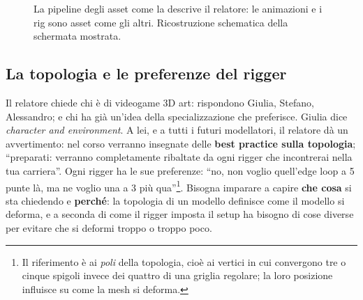 \begin{figure}[htbp]
\centering
{}
\caption{La pipeline degli asset come la descrive il relatore: le animazioni e
i rig sono asset come gli altri. Ricostruzione schematica della schermata
mostrata.}
\label{p4:fig:pipeline}
\end{figure}

\subsection{La topologia e le preferenze del rigger}

Il relatore chiede chi è di videogame 3D art: rispondono Giulia, Stefano,
Alessandro; e chi ha già un'idea della specializzazione che preferisce.
Giulia dice \emph{character and environment}. A lei, e a tutti i futuri
modellatori, il relatore dà un avvertimento: nel corso verranno insegnate
delle \textbf{best practice sulla topologia}; ``preparati: verranno
completamente ribaltate da ogni rigger che incontrerai nella tua carriera''.
Ogni rigger ha le sue preferenze: ``no, non voglio quell'edge loop a 5 punte
là, ma ne voglio una a 3 più qua''\footnote{Il riferimento è ai
\emph{poli} della topologia, cioè ai vertici in cui convergono tre o cinque
spigoli invece dei quattro di una griglia regolare; la loro posizione
influisce su come la mesh si deforma.}. Bisogna imparare a capire
\textbf{che cosa} si sta chiedendo e \textbf{perché}: la topologia di un
modello definisce come il modello si deforma, e a seconda di come il rigger
imposta il setup ha bisogno di cose diverse per evitare che si deformi troppo
o troppo poco.

